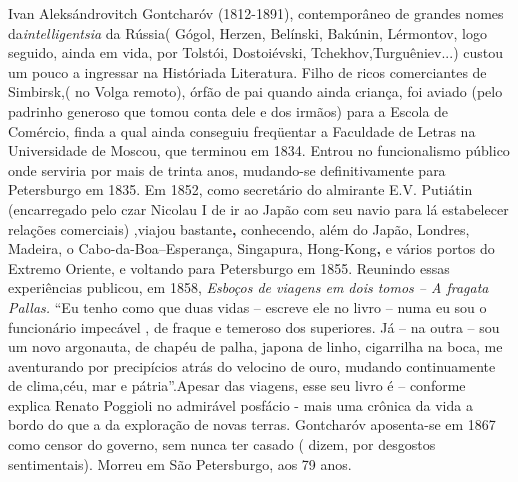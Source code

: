 \protect\hypertarget{__DdeLink__16857_1485881000}{}{\protect\hypertarget{__DdeLink__16837_1485881000}{}{\protect\hypertarget{_Hlk514052680}{}{}}}Ivan
Aleksándrovitch
\protect\hypertarget{__DdeLink__16843_1485881000}{}{\protect\hypertarget{__DdeLink__16840_1485881000}{}{}}Gontcharóv
(1812-1891), contemporâneo de grandes nomes da\emph{intelligentsia} da
Rússia( Gógol, Herzen, Belínski, Bakúnin, Lérmontov, logo seguido, ainda
em vida, por Tolstói, Dostoiévski, Tchekhov,Turguêniev...) custou um
pouco a ingressar na Históriada Literatura. Filho de ricos comerciantes
de Simbirsk,( no Volga remoto), órfão de pai quando ainda criança, foi
aviado (pelo padrinho generoso que tomou conta dele e dos irmãos) para a
Escola de Comércio, finda a qual ainda conseguiu freqüentar a Faculdade
de Letras na Universidade de Moscou, que terminou em 1834. Entrou no
funcionalismo público onde serviria por mais de trinta anos, mudando-se
definitivamente para Petersburgo em 1835. Em 1852, como secretário do
almirante E.V. Putiátin (encarregado pelo czar Nicolau I de ir ao Japão
com seu navio para lá estabelecer relações comerciais) ,viajou
bastante\textbf{,} conhecendo, além do Japão, Londres, Madeira, o
Cabo-da-Boa--Esperança, Singapura, Hong-Kong\textbf{,} e vários portos
do Extremo Oriente, e voltando para Petersburgo em 1855. Reunindo essas
experiências publicou, em 1858, \emph{Esboços de viagens em dois tomos
-- A fragata Pallas.} ``Eu tenho como que duas vidas -- escreve ele no
livro -- numa eu sou o funcionário impecável , de fraque e temeroso dos
superiores. Já -- na outra -- sou um novo argonauta, de chapéu de palha,
japona de linho, cigarrilha na boca, me aventurando por precipícios
atrás do velocino de ouro, mudando continuamente de clima,céu, mar e
pátria''.Apesar das viagens, esse seu livro é -- conforme explica Renato
Poggioli no admirável posfácio - mais uma crônica da vida a bordo do que
a da exploração de novas terras. Gontcharóv aposenta-se em 1867 como
censor do governo, sem nunca ter casado ( dizem, por desgostos
sentimentais). Morreu em São Petersburgo, aos 79 anos.

